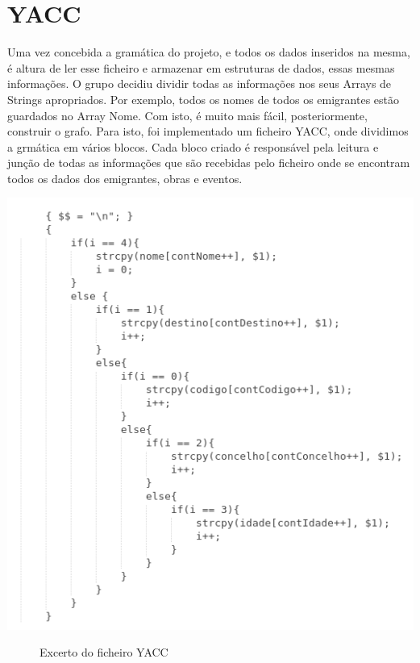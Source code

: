 \documentclass[a4paper]{article}
\begin{document}
\vspace{100px}
\section{YACC}
\label{sec:yacc}

Uma vez concebida a gramática do projeto, e todos os dados inseridos na mesma, é altura de ler esse ficheiro e armazenar em estruturas de dados, essas mesmas informações.
O grupo decidiu dividir todas as informações nos seus Arrays de Strings apropriados. Por exemplo, todos os nomes de todos os emigrantes estão guardados no Array Nome. Com isto, é muito mais fácil, posteriormente, construir o grafo.
Para isto, foi implementado um ficheiro YACC, onde dividimos a grmática em vários blocos. Cada bloco criado é responsável pela leitura e junção de todas as informações que são recebidas pelo ficheiro onde se encontram todos os dados dos emigrantes, obras e eventos.

\begin{center}
	\includegraphics[scale=0.72]{yacc}
	\begin{figure}[!ht]
	\caption{Excerto do ficheiro YACC}
	\end{figure}
\end{center}
\end{document}
